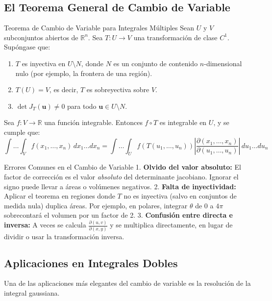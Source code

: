 \documentclass[11pt,a4paper]{article}
\begin{document}
\subsection*{El Teorema General de Cambio de Variable}

\begin{teoremabox}{Teorema de Cambio de Variable para Integrales Múltiples}
Sean $U$ y $V$ subconjuntos abiertos de $\mathbb{R}^n$. Sea $T: U \to V$ una transformación de clase $C^1$. Supóngase que:
\begin{enumerate}
    \item $T$ es inyectiva en $U \setminus N$, donde $N$ es un conjunto de contenido $n$-dimensional nulo (por ejemplo, la frontera de una región).
    \item $T(U) = V$, es decir, $T$ es sobreyectiva sobre $V$.
    \item $\det J_T(\mathbf{u}) \neq 0$ para todo $\mathbf{u} \in U \setminus N$.
\end{enumerate}
Sea $f: V \to \mathbb{R}$ una función integrable. Entonces $f \circ T$ es integrable en $U$, y se cumple que:
\begin{equation*}
\int \dots \int_V f(x_1, \dots, x_n) \, dx_1 \dots dx_n = \int \dots \int_U f(T(u_1, \dots, u_n)) \left| \frac{\partial(x_1, \dots, x_n)}{\partial(u_1, \dots, u_n)} \right| \, du_1 \dots du_n
\end{equation*}
\end{teoremabox}

\begin{errorbox}{Errores Comunes en el Cambio de Variable}
1. \textbf{Olvido del valor absoluto:} El factor de corrección es el valor \textit{absoluto} del determinante jacobiano. Ignorar el signo puede llevar a áreas o volúmenes negativos.
2. \textbf{Falta de inyectividad:} Aplicar el teorema en regiones donde $T$ no es inyectiva (salvo en conjuntos de medida nula) duplica áreas. Por ejemplo, en polares, integrar $\theta$ de $0$ a $4\pi$ sobrecontará el volumen por un factor de 2.
3. \textbf{Confusión entre directa e inversa:} A veces se calcula $\frac{\partial(u,v)}{\partial(x,y)}$ y se multiplica directamente, en lugar de dividir o usar la transformación inversa.
\end{errorbox}

\subsection*{Aplicaciones en Integrales Dobles}

Una de las aplicaciones más elegantes del cambio de variable es la resolución de la integral gaussiana.
\end{document}
